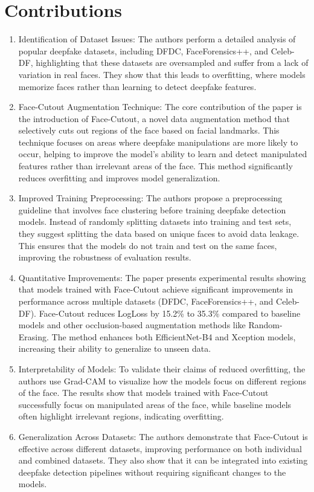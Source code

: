\documentclass{report}
\begin{document}
	\section{Contributions}
	\begin{enumerate}
		\item 
		Identification of Dataset Issues: The authors perform a detailed analysis of popular deepfake datasets, including DFDC, FaceForensics++, and Celeb-DF, highlighting that these datasets are oversampled and suffer from a lack of variation in real faces. They show that this leads to overfitting, where models memorize faces rather than learning to detect deepfake features.
		
		\item 
		Face-Cutout Augmentation Technique: The core contribution of the paper is the introduction of Face-Cutout, a novel data augmentation method that selectively cuts out regions of the face based on facial landmarks. This technique focuses on areas where deepfake manipulations are more likely to occur, helping to improve the model's ability to learn and detect manipulated features rather than irrelevant areas of the face. This method significantly reduces overfitting and improves model generalization.
		
		\item 
		Improved Training Preprocessing: The authors propose a preprocessing guideline that involves face clustering before training deepfake detection models. Instead of randomly splitting datasets into training and test sets, they suggest splitting the data based on unique faces to avoid data leakage. This ensures that the models do not train and test on the same faces, improving the robustness of evaluation results.
		
		\item 
		Quantitative Improvements: The paper presents experimental results showing that models trained with Face-Cutout achieve significant improvements in performance across multiple datasets (DFDC, FaceForensics++, and Celeb-DF). Face-Cutout reduces LogLoss by 15.2\% to 35.3\% compared to baseline models and other occlusion-based augmentation methods like Random-Erasing. The method enhances both EfficientNet-B4 and Xception models, increasing their ability to generalize to unseen data.
		
		\item 
		Interpretability of Models: To validate their claims of reduced overfitting, the authors use Grad-CAM to visualize how the models focus on different regions of the face. The results show that models trained with Face-Cutout successfully focus on manipulated areas of the face, while baseline models often highlight irrelevant regions, indicating overfitting.
		
		\item 
		Generalization Across Datasets: The authors demonstrate that Face-Cutout is effective across different datasets, improving performance on both individual and combined datasets. They also show that it can be integrated into existing deepfake detection pipelines without requiring significant changes to the models.
	\end{enumerate}
	
\end{document}
